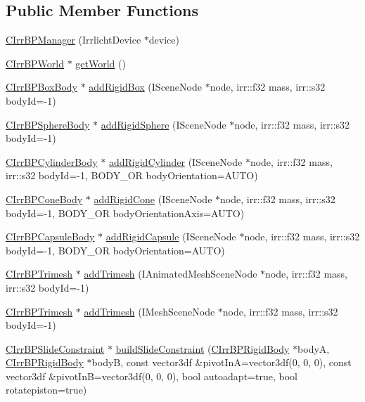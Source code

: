 \subsection*{Public Member Functions}
\begin{DoxyCompactItemize}
\item 
\hyperlink{class_c_irr_b_p_manager_ae449dd7e0fa17f986a8ee2b6afe36a09}{CIrrBPManager} (IrrlichtDevice $\ast$device)
\item 
\hyperlink{class_c_irr_b_p_world}{CIrrBPWorld} $\ast$ \hyperlink{class_c_irr_b_p_manager_acdfaf5f8c351d72c4d9680cb75372ae3}{getWorld} ()
\item 
\hyperlink{class_c_irr_b_p_box_body}{CIrrBPBoxBody} $\ast$ \hyperlink{class_c_irr_b_p_manager_a61ed9d76cfe90285f6e7d80b5870406f}{addRigidBox} (ISceneNode $\ast$node, irr::f32 mass, irr::s32 bodyId=-\/1)
\item 
\hyperlink{class_c_irr_b_p_sphere_body}{CIrrBPSphereBody} $\ast$ \hyperlink{class_c_irr_b_p_manager_aebbe19de8a748a7c66d5d0efc16dc5eb}{addRigidSphere} (ISceneNode $\ast$node, irr::f32 mass, irr::s32 bodyId=-\/1)
\item 
\hyperlink{class_c_irr_b_p_cylinder_body}{CIrrBPCylinderBody} $\ast$ \hyperlink{class_c_irr_b_p_manager_a1b4d6c49c0383e11bbc7a32a14de691d}{addRigidCylinder} (ISceneNode $\ast$node, irr::f32 mass, irr::s32 bodyId=-\/1, BODY\_\-OR bodyOrientation=AUTO)
\item 
\hyperlink{class_c_irr_b_p_cone_body}{CIrrBPConeBody} $\ast$ \hyperlink{class_c_irr_b_p_manager_a810377e264480789138dc4b9ac5145d4}{addRigidCone} (ISceneNode $\ast$node, irr::f32 mass, irr::s32 bodyId=-\/1, BODY\_\-OR bodyOrientationAxis=AUTO)
\item 
\hyperlink{class_c_irr_b_p_capsule_body}{CIrrBPCapsuleBody} $\ast$ \hyperlink{class_c_irr_b_p_manager_acf65bd47e3067b5d7d9574c160acbc38}{addRigidCapsule} (ISceneNode $\ast$node, irr::f32 mass, irr::s32 bodyId=-\/1, BODY\_\-OR bodyOrientation=AUTO)
\item 
\hyperlink{class_c_irr_b_p_trimesh}{CIrrBPTrimesh} $\ast$ \hyperlink{class_c_irr_b_p_manager_ad565fee43722307839908de9aab70344}{addTrimesh} (IAnimatedMeshSceneNode $\ast$node, irr::f32 mass, irr::s32 bodyId=-\/1)
\item 
\hyperlink{class_c_irr_b_p_trimesh}{CIrrBPTrimesh} $\ast$ \hyperlink{class_c_irr_b_p_manager_a14eef4c19ac93cf7dff82544637833e0}{addTrimesh} (IMeshSceneNode $\ast$node, irr::f32 mass, irr::s32 bodyId=-\/1)
\item 
\hyperlink{class_c_irr_b_p_slide_constraint}{CIrrBPSlideConstraint} $\ast$ \hyperlink{class_c_irr_b_p_manager_af916152de29ba8c7c9e727dfe5a1c8af}{buildSlideConstraint} (\hyperlink{class_c_irr_b_p_rigid_body}{CIrrBPRigidBody} $\ast$bodyA, \hyperlink{class_c_irr_b_p_rigid_body}{CIrrBPRigidBody} $\ast$bodyB, const vector3df \&pivotInA=vector3df(0, 0, 0), const vector3df \&pivotInB=vector3df(0, 0, 0), bool autoadapt=true, bool rotatepiston=true)

\end{DoxyCompactItemize}
